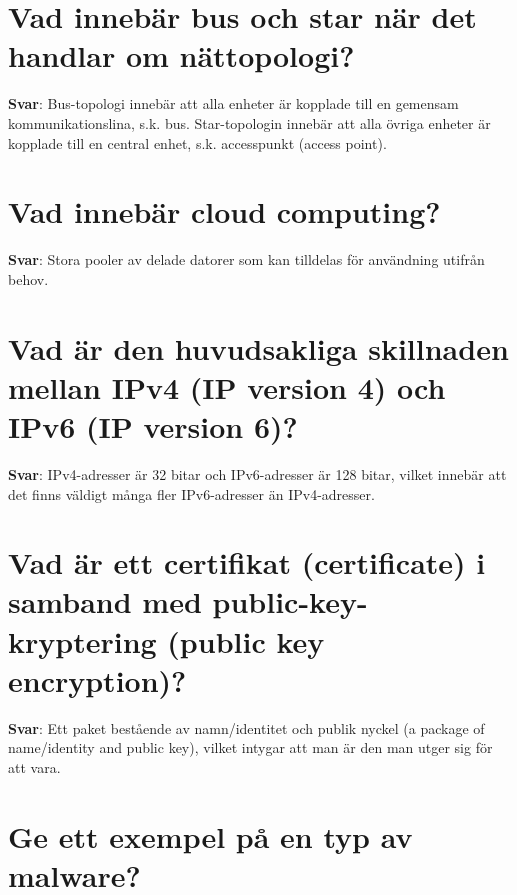 \documentclass[a4paper,11pt,oneside]{book}
\begin{document}
\begin{sloppypar}
\section{Vad inneb\"ar bus och star n\"ar det handlar om n\"attopologi?}

\label{q:138:sa:sv:True}

\textbf{Svar}: Bus-topologi inneb\"ar att alla enheter \"ar kopplade till en gemensam kommunikationslina, s.k. bus. Star-topologin inneb\"ar att alla \"ovriga enheter \"ar kopplade till en central enhet, s.k. accesspunkt (access point).



\section{Vad inneb\"ar cloud computing?}

\label{q:139:sa:sv:True}

\textbf{Svar}: Stora pooler av delade datorer som kan tilldelas f\"or anv\"andning utifr\r{a}n behov.



\section{Vad \"ar den huvudsakliga skillnaden mellan IPv4 (IP version 4) och IPv6 (IP version 6)?}

\label{q:140:sa:sv:True}

\textbf{Svar}: IPv4-adresser \"ar 32 bitar och IPv6-adresser \"ar 128 bitar, vilket inneb\"ar att det finns v\"aldigt m\r{a}nga fler IPv6-adresser \"an IPv4-adresser.



\section{Vad \"ar ett certifikat (certificate) i samband med public-key-kryptering (public key encryption)?}

\label{q:141:sa:sv:True}

\textbf{Svar}: Ett paket best\r{a}ende av namn/identitet och publik nyckel (a package of name/identity and public key), vilket intygar att man \"ar den man utger sig f\"or att vara.



\section{Ge ett exempel p\r{a} en typ av malware?}


\end{sloppypar}
\end{document}
